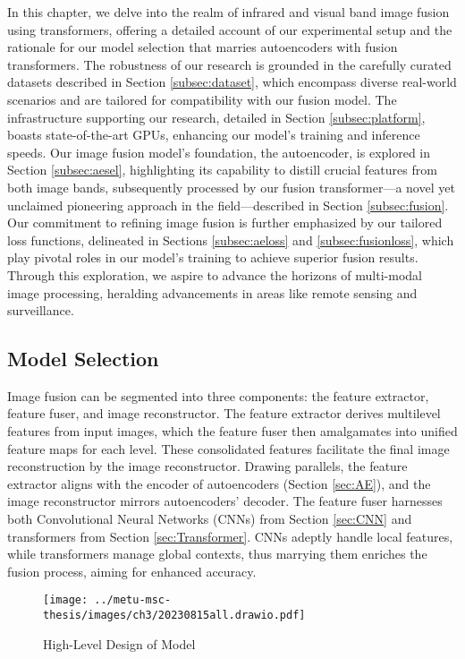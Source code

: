 \label{chp:b3}

In this chapter, we delve into the realm of infrared and visual band image fusion using transformers, offering a detailed account of our experimental setup and the rationale for our model selection that marries autoencoders with fusion transformers. The robustness of our research is grounded in the carefully curated datasets described in Section \ref{subsec:dataset}, which encompass diverse real-world scenarios and are tailored for compatibility with our fusion model. The infrastructure supporting our research, detailed in Section \ref{subsec:platform}, boasts state-of-the-art GPUs, enhancing our model's training and inference speeds. Our image fusion model's foundation, the autoencoder, is explored in Section \ref{subsec:aesel}, highlighting its capability to distill crucial features from both image bands, subsequently processed by our fusion transformer—a novel yet unclaimed pioneering approach in the field—described in Section \ref{subsec:fusion}. Our commitment to refining image fusion is further emphasized by our tailored loss functions, delineated in Sections \ref{subsec:aeloss} and \ref{subsec:fusionloss}, which play pivotal roles in our model's training to achieve superior fusion results. Through this exploration, we aspire to advance the horizons of multi-modal image processing, heralding advancements in areas like remote sensing and surveillance.
\subsection{Model Selection} \label{sec:model}

Image fusion can be segmented into three components: the feature extractor, feature fuser, and image reconstructor. The feature extractor derives multilevel features from input images, which the feature fuser then amalgamates into unified feature maps for each level. These consolidated features facilitate the final image reconstruction by the image reconstructor. Drawing parallels, the feature extractor aligns with the encoder of autoencoders (Section \ref{sec:AE}), and the image reconstructor mirrors autoencoders' decoder. The feature fuser harnesses both Convolutional Neural Networks (CNNs) from Section \ref{sec:CNN} and transformers from Section \ref{sec:Transformer}. CNNs adeptly handle local features, while transformers manage global contexts, thus marrying them enriches the fusion process, aiming for enhanced accuracy.
\begin{figure}[htbp]
    \centering
    \texttt{[image: ../metu-msc-thesis/images/ch3/20230815all.drawio.pdf]}
    \caption{High-Level Design of Model}
    \label{fig:ch3:highlevel}
\end{figure}

